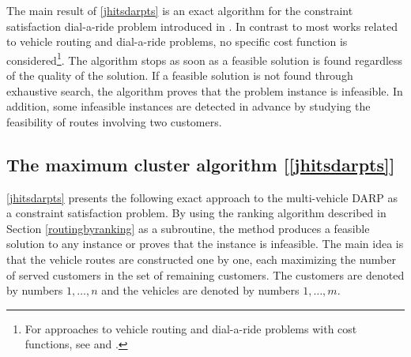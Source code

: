 \documentclass[dissertation,draft*]{aaltoseries}
\begin{document}
The main result of \ref{jhitsdarpts} is an exact algorithm for the constraint satisfaction dial-a-ride problem
introduced in \cite{berbegliafeas}. In contrast to most works related to vehicle routing and dial-a-ride problems,
no specific cost function is considered\footnote{
For approaches to vehicle routing and dial-a-ride problems with cost functions, 
see \cite{braysy01,braysy02,groer} and \cite{cordeau02,berbegliahybrid}.}. 
The algorithm stops as soon as a feasible solution is found regardless of
the quality of the solution. If a feasible solution is not found through exhaustive search, the algorithm 
proves that the problem instance is infeasible. In addition, some infeasible instances are detected in advance
by studying the feasibility of routes involving two customers. 


\subsection{The maximum cluster algorithm [\ref{jhitsdarpts}]}
\label{mvsolution}
\ref{jhitsdarpts} presents the following exact approach to the multi-vehicle DARP as a constraint satisfaction problem.
By using the ranking algorithm  described in Section \ref{routingbyranking} as a subroutine,
 the method produces a feasible solution to 
any instance or proves that the instance is infeasible. The main idea is that the vehicle routes are constructed
one by one, each maximizing the number of served customers in the set of remaining customers.
The customers are denoted by numbers $1,\ldots,n$ and the vehicles are denoted by numbers $1,\ldots,m$.
\end{document}
